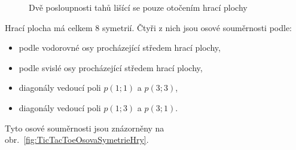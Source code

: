 \documentclass[12pt,a4paper]{article}
\begin{document}
\begin{figure}[h]
    \begin{center}

        \caption{Dvě posloupnosti tahů lišící se pouze otočením hrací plochy}
        \label{fig:TicTacToeRotaceHraciPlochy}
    \end{center}
\end{figure}

Hrací plocha má celkem 8 symetrií. Čtyři z nich jsou osové souměrnosti podle:
\begin{itemize}
    \item podle vodorovné osy procházející středem hrací plochy,
    \item podle svislé osy procházející středem hrací plochy,
    \item diagonály vedoucí poli $p(1;1)$ a $p(3;3)$,
    \item diagonály vedoucí poli $p(1;3)$ a $p(3;1)$.
\end{itemize}

Tyto osové souměrnosti jsou znázorněny na obr.~\ref{fig:TicTacToeOsovaSymetrieHry}.
\end{document}
